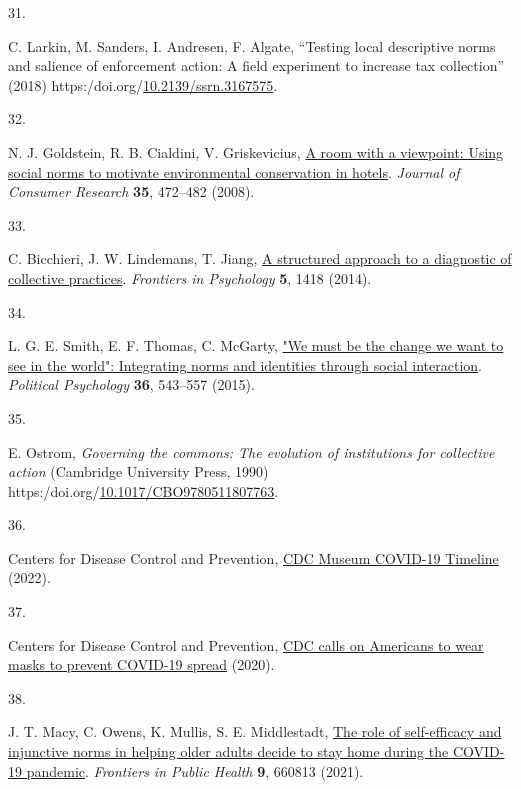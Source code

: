 \documentclass[
  man, donotrepeattitle,floatsintext]{apa6}
\newlength{\cslhangindent}
\newlength{\csllabelwidth}
\newlength{\cslentryspacingunit} %
\newenvironment{CSLReferences}[2] %
 {%
  \setlength{\parindent}{0pt}
  \ifodd #1
  \let\oldpar\par
  \def\par{\hangindent=\cslhangindent\oldpar}
  \fi
  \setlength{\parskip}{#2\cslentryspacingunit}
 }%
 {}
\newcommand{\CSLLeftMargin}[1]{\parbox[t]{\csllabelwidth}{#1}}
\newcommand{\CSLRightInline}[1]{\parbox[t]{\linewidth - \csllabelwidth}{#1}\break}
\begin{document}
\begin{CSLReferences}{0}{0}
\leavevmode{}%
\CSLLeftMargin{31. }%
\CSLRightInline{C. Larkin, M. Sanders, I. Andresen, F. Algate, {``Testing local descriptive norms and salience of enforcement action: A field experiment to increase tax collection''} (2018) https:/doi.org/\href{https://doi.org/10.2139/ssrn.3167575}{10.2139/ssrn.3167575}.}

\leavevmode{}%
\CSLLeftMargin{32. }%
\CSLRightInline{N. J. Goldstein, R. B. Cialdini, V. Griskevicius, \href{https://doi.org/10.1086/586910}{A room with a viewpoint: Using social norms to motivate environmental conservation in hotels}. \emph{Journal of Consumer Research} \textbf{35}, 472--482 (2008).}

\leavevmode{}%
\CSLLeftMargin{33. }%
\CSLRightInline{C. Bicchieri, J. W. Lindemans, T. Jiang, \href{https://doi.org/10.3389/fpsyg.2014.01418}{A structured approach to a diagnostic of collective practices}. \emph{Frontiers in Psychology} \textbf{5}, 1418 (2014).}

\leavevmode{}%
\CSLLeftMargin{34. }%
\CSLRightInline{L. G. E. Smith, E. F. Thomas, C. McGarty, \href{https://doi.org/10.1111/pops.12180}{"We must be the change we want to see in the world": Integrating norms and identities through social interaction}. \emph{Political Psychology} \textbf{36}, 543--557 (2015).}

\leavevmode{}%
\CSLLeftMargin{35. }%
\CSLRightInline{E. Ostrom, \emph{Governing the commons: The evolution of institutions for collective action} (Cambridge University Press, 1990) https:/doi.org/\href{https://doi.org/10.1017/CBO9780511807763}{10.1017/CBO9780511807763}.}

\leavevmode{}%
\CSLLeftMargin{36. }%
\CSLRightInline{Centers for Disease Control and Prevention, \href{https://www.cdc.gov/museum/timeline/covid19.html}{{CDC Museum COVID-19 Timeline}} (2022).}

\leavevmode{}%
\CSLLeftMargin{37. }%
\CSLRightInline{Centers for Disease Control and Prevention, \href{https://www.cdc.gov/media/releases/2020/p0714-americans-to-wear-masks.html}{{CDC calls on Americans to wear masks to prevent COVID-19 spread}} (2020).}

\leavevmode{}%
\CSLLeftMargin{38. }%
\CSLRightInline{J. T. Macy, C. Owens, K. Mullis, S. E. Middlestadt, \href{https://doi.org/10.3389/fpubh.2021.660813}{The role of self-efficacy and injunctive norms in helping older adults decide to stay home during the {COVID-19} pandemic}. \emph{Frontiers in Public Health} \textbf{9}, 660813 (2021).}


\end{CSLReferences}
\end{document}
